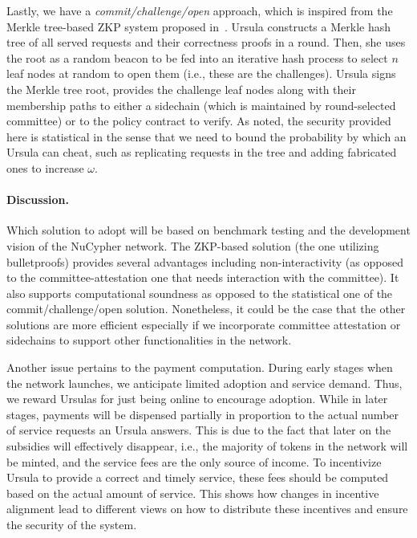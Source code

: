 \documentclass{llncs}
\begin{document}
Lastly, we have a \emph{commit/challenge/open} approach, which is inspired from the Merkle tree-based ZKP system proposed in~\cite{dottling19}. Ursula constructs a Merkle hash tree of all served requests and their correctness proofs in a round. Then, she uses the root as a random beacon to be fed into an iterative hash process to select $n$ leaf nodes at random to open them (i.e., these are the challenges). Ursula signs the Merkle tree root, provides the challenge leaf nodes along with their membership paths to either a sidechain (which is maintained by round-selected committee) or to the policy contract to verify. As noted, the security provided here is statistical in the sense that we need to bound the probability by which an Ursula can cheat, such as replicating requests in the tree and adding fabricated ones to increase $\omega$. 


\paragraph{Discussion.} Which solution to adopt will be based on benchmark testing and the development vision of the NuCypher network. The ZKP-based solution (the one utilizing bulletproofs) provides several advantages including non-interactivity (as opposed to the committee-attestation one that needs interaction with the committee). It also supports computational soundness as opposed to the statistical one of the commit/challenge/open solution. Nonetheless, it could be the case that the other solutions are more efficient especially if we incorporate committee attestation or sidechains to support other functionalities in the network. 


Another issue pertains to the payment computation. During early stages when the network launches, we anticipate  limited adoption and service demand. Thus, we reward Ursulas for just being online to encourage adoption. While in later stages, payments will be dispensed partially in proportion to the actual number of service requests an Ursula answers. This is due to the fact that later on the subsidies will effectively disappear, i.e., the majority of tokens in the network will be minted, and the service fees are the only source of income. To incentivize Ursula to provide a correct and timely service, these fees should be computed based on the actual amount of service. This shows how changes in incentive alignment lead to different views on how to distribute these incentives and ensure the security of the system.
\end{document}
